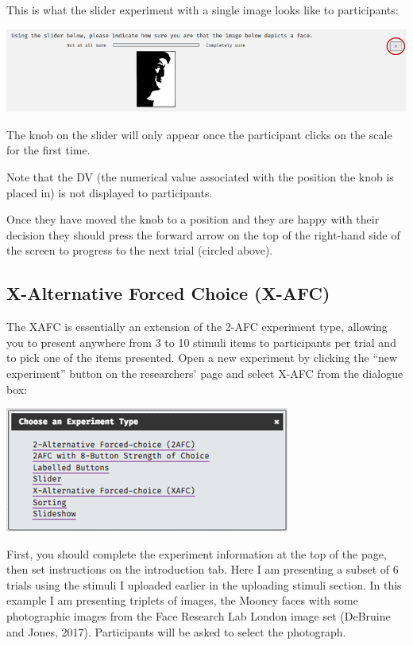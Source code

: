 \documentclass[]{book}
\begin{document}
This is what the slider experiment with a single image looks like to
participants:

\includegraphics{images/screenshots/view_slider.png}

The knob on the slider will only appear once the participant clicks on
the scale for the first time.

Note that the DV (the numerical value associated with the position the
knob is placed in) is not displayed to participants.

Once they have moved the knob to a position and they are happy with
their decision they should press the forward arrow on the top of the
right-hand side of the screen to progress to the next trial (circled
above).

\subsection{X-Alternative Forced Choice
(X-AFC)}\label{x-alternative-forced-choice-x-afc}

The XAFC is essentially an extension of the 2-AFC experiment type,
allowing you to present anywhere from 3 to 10 stimuli items to
participants per trial and to pick one of the items presented. Open a
new experiment by clicking the ``new experiment'' button on the
researchers' page and select X-AFC from the dialogue box:

\includegraphics{images/screenshots/exp_2.png}

First, you should complete the experiment information at the top of the
page, then set instructions on the introduction tab. Here I am
presenting a subset of 6 trials using the stimuli I uploaded earlier in
the uploading stimuli section. In this example I am presenting triplets
of images, the Mooney faces with some photographic images from the Face
Research Lab London image set (DeBruine and Jones, 2017). Participants
will be asked to select the photograph.
\end{document}
